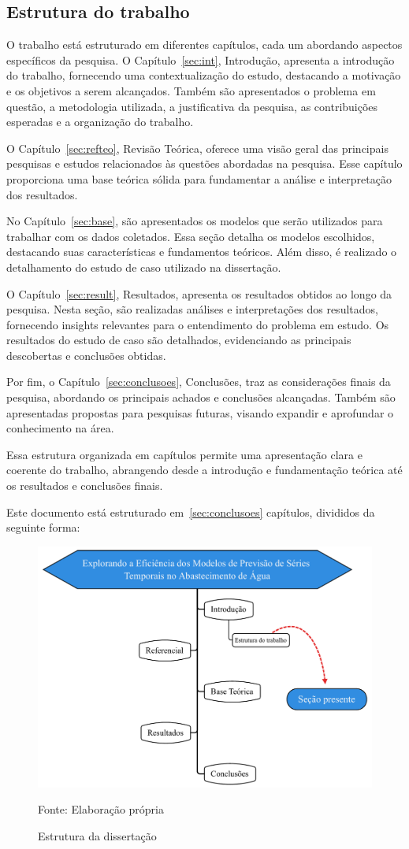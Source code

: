 \subsection{Estrutura do trabalho} \label{subsec:estrutura}



O trabalho está estruturado em diferentes capítulos, cada um abordando aspectos específicos da pesquisa. 
O Capítulo~\ref{sec:int}, Introdução, apresenta a introdução do trabalho, fornecendo uma contextualização do estudo, destacando a motivação e os objetivos a serem alcançados. Também são apresentados o problema em questão, a metodologia utilizada, a justificativa da pesquisa, as contribuições esperadas e a organização do trabalho.

O Capítulo~\ref{sec:refteo}, Revisão Teórica, oferece uma visão geral das principais pesquisas e estudos relacionados às questões abordadas na pesquisa. Esse capítulo proporciona uma base teórica sólida para fundamentar a análise e interpretação dos resultados.

No Capítulo~\ref{sec:base}, são apresentados os modelos que serão utilizados para trabalhar com os dados coletados. Essa seção detalha os modelos escolhidos, destacando suas características e fundamentos teóricos. Além disso, é realizado o detalhamento do estudo de caso utilizado na dissertação.

O Capítulo~\ref{sec:result}, Resultados, apresenta os resultados obtidos ao longo da pesquisa. Nesta seção, são realizadas análises e interpretações dos resultados, fornecendo insights relevantes para o entendimento do problema em estudo. Os resultados do estudo de caso são detalhados, evidenciando as principais descobertas e conclusões obtidas.

Por fim, o Capítulo~\ref{sec:conclusoes}, Conclusões, traz as considerações finais da pesquisa, abordando os principais achados e conclusões alcançadas. Também são apresentadas propostas para pesquisas futuras, visando expandir e aprofundar o conhecimento na área.

Essa estrutura organizada em capítulos permite uma apresentação clara e coerente do trabalho, abrangendo desde a introdução e fundamentação teórica até os resultados e conclusões finais.

 Este documento está estruturado em~\ref{sec:conclusoes} capítulos, divididos da seguinte forma:

\begin{figure}[H]
	\centering
	\caption{Estrutura da dissertação}
	\label{fig:estrutura}
	\includegraphics[width=0.9\linewidth]{Introducao/Figuras/Estrutura}
	
	Fonte: Elaboração própria 
\end{figure}

